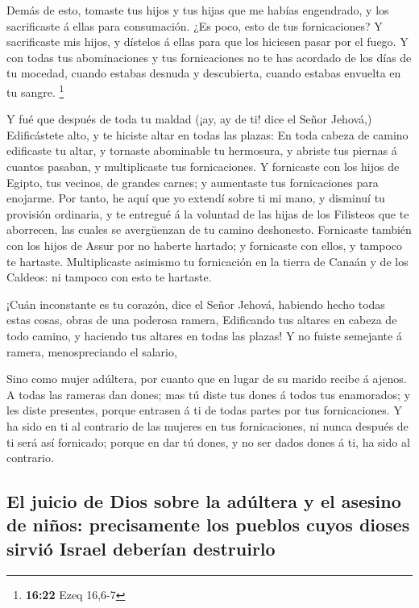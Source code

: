  Demás de esto, tomaste tus hijos y tus hijas que me
habías engendrado, y los sacrificaste á ellas para consumación. ¿Es
poco, esto de tus fornicaciones?  Y sacrificaste mis
hijos, y dístelos á ellas para que los hiciesen pasar por el fuego.
 Y con todas tus abominaciones y tus fornicaciones no te
has acordado de los días de tu mocedad, cuando estabas desnuda y
descubierta, cuando estabas envuelta en tu sangre. \footnote{\textbf{16:22}
  Ezeq 16,6-7}

 Y fué que después de toda tu maldad (¡ay, ay de ti! dice
el Señor Jehová,)  Edificástete alto, y te hiciste altar
en todas las plazas:  En toda cabeza de camino edificaste
tu altar, y tornaste abominable tu hermosura, y abriste tus piernas á
cuantos pasaban, y multiplicaste tus fornicaciones.  Y
fornicaste con los hijos de Egipto, tus vecinos, de grandes carnes; y
aumentaste tus fornicaciones para enojarme.  Por tanto,
he aquí que yo extendí sobre ti mi mano, y disminuí tu provisión
ordinaria, y te entregué á la voluntad de las hijas de los Filisteos que
te aborrecen, las cuales se avergüenzan de tu camino deshonesto.
 Fornicaste también con los hijos de Assur por no haberte
hartado; y fornicaste con ellos, y tampoco te hartaste. 
Multiplicaste asimismo tu fornicación en la tierra de Canaán y de los
Caldeos: ni tampoco con esto te hartaste.

 ¡Cuán inconstante es tu corazón, dice el Señor Jehová,
habiendo hecho todas estas cosas, obras de una poderosa ramera,
 Edificando tus altares en cabeza de todo camino, y
haciendo tus altares en todas las plazas! Y no fuiste semejante á
ramera, menospreciando el salario,

 Sino como mujer adúltera, por cuanto que en lugar de su
marido recibe á ajenos.  A todas las rameras dan dones;
mas tú diste tus dones á todos tus enamorados; y les diste presentes,
porque entrasen á ti de todas partes por tus fornicaciones.
 Y ha sido en ti al contrario de las mujeres en tus
fornicaciones, ni nunca después de ti será así fornicado; porque en dar
tú dones, y no ser dados dones á ti, ha sido al contrario.

\hypertarget{el-juicio-de-dios-sobre-la-aduxfaltera-y-el-asesino-de-niuxf1os-precisamente-los-pueblos-cuyos-dioses-sirviuxf3-israel-deberuxedan-destruirlo}{%
\subsection{El juicio de Dios sobre la adúltera y el asesino de niños:
precisamente los pueblos cuyos dioses sirvió Israel deberían
destruirlo}\label{el-juicio-de-dios-sobre-la-aduxfaltera-y-el-asesino-de-niuxf1os-precisamente-los-pueblos-cuyos-dioses-sirviuxf3-israel-deberuxedan-destruirlo}}

